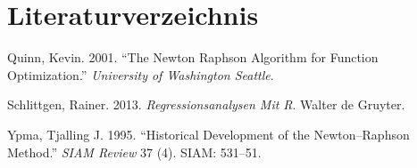 \documentclass[12pt,]{article}
\newenvironment{Shaded}{\begin{snugshade}}{\end{snugshade}}
\newcommand{\KeywordTok}[1]{\textcolor[rgb]{0.13,0.29,0.53}{\textbf{#1}}}
\newcommand{\DecValTok}[1]{\textcolor[rgb]{0.00,0.00,0.81}{#1}}
\newcommand{\StringTok}[1]{\textcolor[rgb]{0.31,0.60,0.02}{#1}}
\newcommand{\CommentTok}[1]{\textcolor[rgb]{0.56,0.35,0.01}{\textit{#1}}}
\newcommand{\OperatorTok}[1]{\textcolor[rgb]{0.81,0.36,0.00}{\textbf{#1}}}
\newcommand{\NormalTok}[1]{#1}
\begin{document}
\begin{Shaded}
\end{Shaded}

\section*{Literaturverzeichnis}\label{literaturverzeichnis}

\hypertarget{refs}{}
\hypertarget{ref-quinn2001newton}{}
Quinn, Kevin. 2001. ``The Newton Raphson Algorithm for Function
Optimization.'' \emph{University of Washington Seattle}.

\hypertarget{ref-schlittgen2013regressionsanalysen}{}
Schlittgen, Rainer. 2013. \emph{Regressionsanalysen Mit R}. Walter de
Gruyter.

\hypertarget{ref-ypma1995historical}{}
Ypma, Tjalling J. 1995. ``Historical Development of the Newton--Raphson
Method.'' \emph{SIAM Review} 37 (4). SIAM: 531--51.
\end{document}
